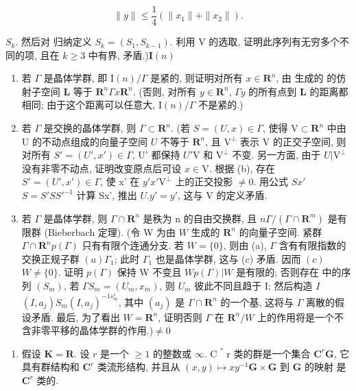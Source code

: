 \[
\| y \| \leqslant \frac {1}{4} (\| x _ {1} \| + \| x _ {2} \|).
\]

\(S_{k}\). 然后对  归纳定义 \(S_{k}=(S_{1},S_{k-1})\). 利用 V 的选取, 证明此序列有无穷多个不同的项, 且在 \(k\geqslant3\) 中有界, 矛盾.)\(\mathbf{I}(n)\)

\begin{enumerate}
\def\labelenumi{(\alph{enumi})}
\setcounter{enumi}{1}
\item
  若 \(\Gamma\) 是晶体学群, 即 \(\mathrm{I}(n)/\Gamma\) 是紧的, 则证明对所有 \(x \in \mathbf{R}^n\), 由  生成的  的仿射子空间 \(\mathbf{L}\) 等于 \(\mathbf{R}^n\)\(\Gamma x\)\(\mathbf{R}^n\). (否则, 对所有 \(y \in \mathbf{R}^n\), \(\Gamma y\) 的所有点到 \(\mathbf{L}\) 的距离都相同; 由于这个距离可以任意大, \(\mathrm{I}(n)/\Gamma\) 不是紧的.)
\item
  若 \(\Gamma\) 是交换的晶体学群, 则 \(\Gamma \subset \mathbf{R}^n\). (若 \(S = (U, x) \in \Gamma\), 使得 \(\mathrm{V} \subset \mathbf{R}^n\) 中由 U 的不动点组成的向量子空间 \(U\) 不等于 \(\mathbf{R}^n\), 且 \(\mathrm{V}^\perp\) 表示 \(\mathrm{V}\) 的正交子空间, 则对所有 \(S' = (U', x') \in \Gamma\), U' 都保持 \(U'\)\(\mathrm{V}\) 和 \(\mathrm{V}^\perp\) 不变. 另一方面, 由于 \(U|\mathrm{V}^\perp\) 没有非零不动点, 证明改变原点后可设 \(x \in \mathrm{V}\). 根据 (b), 存在 \(S' = (U', x') \in \Gamma\), 使 x' 在 \(y'\)\(x'\)\(\mathrm{V}^\perp\) 上的正交投影 \(\neq 0\). 用公式 \(Sx'\)\(S = S'SS'^{-1}\) 计算 Sx', 推出 \(U.y' = y'\), 这与 \(\mathrm{V}\) 的定义矛盾.
\item
  若 \(\Gamma\) 是晶体学群, 则 \(\Gamma \cap \mathbf{R}^n\) 是秩为 n 的自由交换群, 且 \(n\)\(\Gamma / (\Gamma \cap \mathbf{R}^m)\) 是有限群 (Bieberbach 定理). (令 W 为由 \(W\) 生成的 \(\mathbf{R}^n\) 的向量子空间. 紧群 \(\Gamma \cap \mathbf{R}^n\)\(p(\Gamma)\) 只有有限个连通分支. 若 \(W = \{0\}\), 则由 (a), \(\Gamma\) 含有有限指数的交换正规子群 \((a)\)\(\Gamma_1\); 此时 \(\Gamma_1\) 也是晶体学群, 这与 (c) 矛盾. 因而 \((c)\)\(W \neq \{0\}\). 证明 \(p(\Gamma)\) 保持 W 不变且 \(W\)\(p(\Gamma)|W\) 是有限的; 否则存在  中的序列 \((S_m)\), 若 \(\Gamma\)\(S_m = (U_m, x_m)\), 则 \(U_m\) 彼此不同且趋于 I; 然后构造 \(I\)\((I, a_j)S_m(I, a_j)^{-1s_m^1}\), 其中 \((a_j)\) 是 \(\Gamma \cap \mathbf{R}^n\) 的一个基, 这将与 \(\Gamma\) 离散的假设矛盾. 最后, 为了看出 \(W = \mathbf{R}^n\), 证明否则 \(\Gamma\) 在 \(\mathbf{R}^n/W\) 上的作用将是一个不含非零平移的晶体学群的作用.)\(\neq 0\)
\end{enumerate}


\begin{enumerate}
\def\labelenumi{\arabic{enumi}.}
\tightlist
\item
  假设 \(\mathbf{K} = \mathbf{R}\). 设 \(r\) 是一个 \(\geqslant 1\) 的整数或 \(\infty\). C＾r 类的群是一个集合 \(\mathbf{C}^r\)\(\mathbf{G}\), 它具有群结构和 \(\mathbf{C}^r\) 类流形结构, 并且从 \((x,y)\mapsto xy^{-1}\)\(\mathbf{G}\times \mathbf{G}\) 到 \(\mathbf{G}\) 的映射  是 \(\mathbf{C}^r\) 类的.
\end{enumerate}

